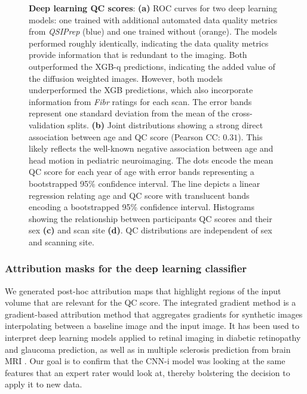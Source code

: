 \documentclass[9pt,lineno]{elife}
\begin{document}
\begin{figure}[tbp]
\begin{subfigure}{\linewidth}
    \end{subfigure}
    \caption{%
        {\bf Deep learning QC scores}:
        \textbf{(a)} ROC curves for two deep learning models: one trained with
        additional automated data quality metrics from \emph{QSIPrep} (blue) and one
        trained without (orange). The models performed roughly identically,
        indicating the data quality metrics provide information that is redundant to
        the imaging. Both outperformed the XGB-q predictions, indicating the
        added value of the diffusion weighted images. However, both models
        underperformed the XGB predictions, which also incorporate
        information from \emph{Fibr} ratings for each scan. The error bands
        represent one standard deviation from the mean of the cross-validation
        splits.
        \textbf{(b)} Joint distributions showing a strong direct association
        between age and QC score (Pearson CC: $0.31$). This likely reflects the well-known negative
        association between age and head motion in pediatric neuroimaging.
        The dots encode the mean QC score for each year of age with error bands
        representing a bootstrapped 95\% confidence interval. The line depicts
        a linear regression relating age and QC score with translucent bands
        encoding a bootstrapped 95\% confidence interval.
        Histograms showing the relationship between participants QC scores and
        their sex \textbf{(c)} and scan site \textbf{(d)}. QC distributions are independent
        of sex and scanning site.
    }
    \label{fig:dl-qc}
\end{figure}

\subsubsection{Attribution masks for the deep learning classifier}

We generated post-hoc attribution maps that highlight regions of the input
volume that are relevant for the QC score. The integrated gradient method
\citep{sundararajan2017axiomatic} is a gradient-based attribution method
\citep{ancona2019gradient} that aggregates gradients for synthetic images
interpolating between a baseline image and the input image. It has been used to
interpret deep learning models applied to retinal imaging in diabetic
retinopathy \citep{sayres2019using} and glaucoma \citep{Mehta2021-zp} prediction,
as well as in multiple sclerosis prediction from brain MRI
\citep{wargnier-dauchelle2021interpretable}. Our goal is to confirm that the
CNN-i model was looking at the same features that an expert rater would look at,
thereby bolstering the decision to apply it to new data.
\end{document}
